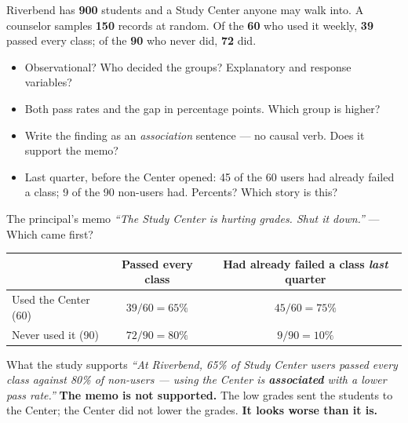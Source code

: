 \documentclass[aspectratio=169, 11pt]{beamer}
\newcommand{\redink}[1]{{\color{redacc}\bfseries #1}}
\begin{document}
\begin{frame}[t, plain]
  Riverbend has \textbf{900} students and a Study Center anyone may walk into. A counselor
  samples \textbf{150} records at random. Of the \textbf{60} who used it weekly, \textbf{39}
  passed every class; of the \textbf{90} who never did, \textbf{72} did.
  \vspace{4pt}
  \begin{itemize}\setlength{\itemsep}{4pt}
    \item[15.] Observational? Who decided the groups? Explanatory and response variables?
    \item[16.] Both pass rates and the gap in percentage points. Which group is higher?
    \item[17.] Write the finding as an \emph{association} sentence --- no causal verb. Does it
          support the memo?
    \item[18.] Last quarter, before the Center opened: 45 of the 60 users had already failed a
          class; 9 of the 90 non-users had. Percents? Which story is this?
  \end{itemize}
  \begin{block}{The principal's memo}
    \emph{``The Study Center is hurting grades. Shut it down.''} --- Which came first?
  \end{block}
\end{frame}

\begin{frame}[t, plain]
  \vspace{4pt}
  \begin{center}
    \small
    \renewcommand{\arraystretch}{1.3}
    \begin{tabular}{@{} l c c @{}}
    \hline
    & \textbf{Passed every class} & \textbf{Had already failed a class \emph{last} quarter} \\
    \hline
    Used the Center (60)  & $39/60 = 65\%$ & $45/60 = 75\%$ \\
    Never used it (90)    & $72/90 = 80\%$ & $9/90 = 10\%$ \\
    \hline
    \end{tabular}
  \end{center}
  \vspace{8pt}
  \begin{block}{What the study supports}
    \emph{``At Riverbend, 65\% of Study Center users passed every class against 80\% of
    non-users --- using the Center is \textbf{associated} with a lower pass rate.''}
    \redink{The memo is not supported.} The low grades sent the students to the Center; the
    Center did not lower the grades. \textbf{It looks worse than it is.}
  \end{block}
\end{frame}
\end{document}
